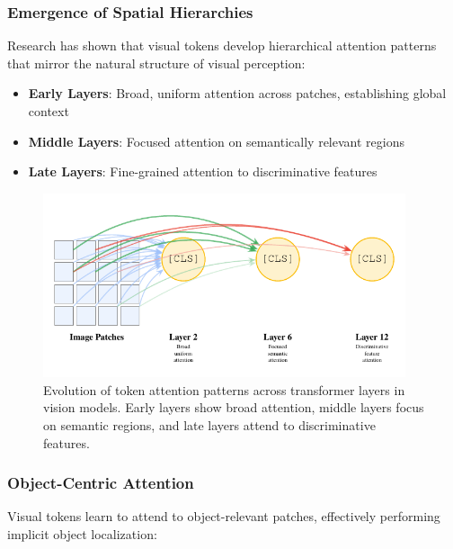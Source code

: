 \subsubsection{Emergence of Spatial Hierarchies}

Research has shown that visual \cls{} tokens develop hierarchical attention patterns that mirror the natural structure of visual perception:

\begin{itemize}
\item \textbf{Early Layers}: Broad, uniform attention across patches, establishing global context
\item \textbf{Middle Layers}: Focused attention on semantically relevant regions
\item \textbf{Late Layers}: Fine-grained attention to discriminative features
\end{itemize}

\begin{figure}[htbp]
\centering
\includegraphics[width=0.95\textwidth]{part2/chapter04/fig_vit_cls_attention.pdf}
\caption{Evolution of \cls{} token attention patterns across transformer layers in vision models. Early layers show broad attention, middle layers focus on semantic regions, and late layers attend to discriminative features.}
\end{figure}

\subsubsection{Object-Centric Attention}

Visual \cls{} tokens learn to attend to object-relevant patches, effectively performing implicit object localization:

